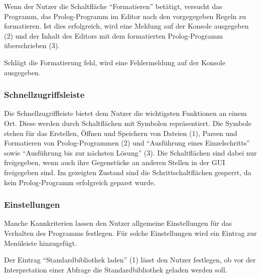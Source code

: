 \documentclass[parskip=full,11pt,twoside]{scrartcl}
\begin{document}
Wenn der Nutzer die Schaltfläche \enquote{Formatieren} betätigt, versucht das Programm, das Prolog-Programm im Editor nach den vorgegegeben Regeln zu formatieren.
Ist dies erfolgreich, wird eine Meldung auf der Konsole ausgegeben (2) und der Inhalt des Editors mit dem formatierten Prolog-Programm überschrieben (3).

Schlägt die Formatierung fehl, wird eine Fehlermeldung auf der Konsole ausgegeben.

\subsubsection{Schnellzugriffsleiste}

\begin{minipage}{\linewidth}
\end{minipage}

Die Schnellzugriffleiste bietet dem Nutzer die wichtigsten Funktionen an einem Ort.
Diese werden durch Schaltflächen mit Symbolen repräsentiert.
Die Symbole stehen für das Erstellen, Öffnen und Speichern von Dateien (1), Parsen und Formatieren von Prolog-Programmen (2) und \enquote{Ausführung eines Einzelschritts} sowie \enquote{Ausführung bis zur nächsten Lösung} (3).
Die Schaltflächen sind dabei nur freigegeben, wenn auch ihre Gegenstücke an anderen Stellen in der GUI freigegeben sind.
Im gezeigten Zustand sind die Schrittschaltflächen gesperrt, da kein Prolog-Programm erfolgreich geparst wurde.

\subsubsection{Einstellungen}

Manche Kannkriterien lassen den Nutzer allgemeine Einstellungen für das Verhalten des Programms festlegen.
Für solche Einstellungen wird ein Eintrag zur Menüleiste hinzugefügt.

\begin{minipage}{\linewidth}
\end{minipage}

Der Eintrag \enquote{Standardbibliothek laden} (1) lässt den Nutzer festlegen, ob vor der Interpretation einer Abfrage die Standardbibliothek geladen werden soll.
\end{document}

